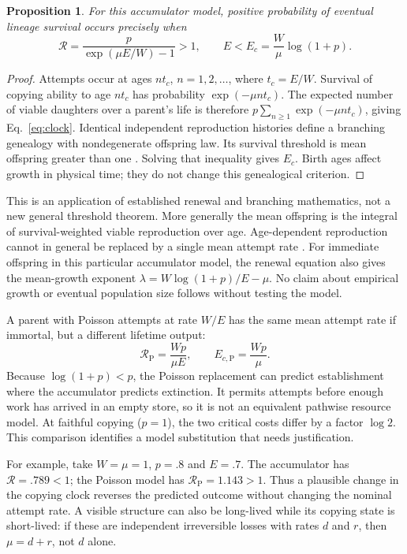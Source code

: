 \documentclass[11pt,a4paper]{article}
\newtheorem{proposition}{Proposition}
\begin{document}
\begin{proposition}
For this accumulator model, positive probability of eventual lineage survival
occurs precisely when
\begin{equation}
 \mathcal R=\frac{p}{\exp(\mu E/W)-1}>1,
 \qquad E<E_c=\frac{W}{\mu}\log(1+p).
 \label{eq:clock}
\end{equation}
\end{proposition}
\begin{proof}
Attempts occur at ages $nt_c$, $n=1,2,\ldots$, where $t_c=E/W$. Survival of copying
ability to age $nt_c$ has probability $\exp(-\mu nt_c)$. The expected number of
viable daughters over a parent's life is therefore
$p\sum_{n\ge1}\exp(-\mu nt_c)$, giving Eq.~\eqref{eq:clock}. Identical independent
reproduction histories define a branching genealogy with nondegenerate offspring
law. Its survival threshold is mean offspring greater than one \cite{branching}.
Solving that inequality gives $E_c$. Birth ages affect growth in physical time;
they do not change this genealogical criterion.
\end{proof}

This is an application of established renewal and branching mathematics, not a
new general threshold theorem. More generally the mean offspring is the integral
of survival-weighted viable reproduction over age. Age-dependent reproduction
cannot in general be replaced by a single mean attempt rate \cite{age}.
For immediate offspring in this particular accumulator model, the renewal equation
also gives the mean-growth exponent $\lambda=W\log(1+p)/E-\mu$. No claim about
empirical growth or eventual population size follows without testing the model.

A parent with Poisson attempts at rate $W/E$ has the same mean attempt rate if
immortal, but a different lifetime output:
\begin{equation}
 \mathcal R_{\mathrm P}=\frac{Wp}{\mu E},\qquad
 E_{c,\mathrm P}=\frac{Wp}{\mu}.
 \label{eq:poisson}
\end{equation}
Because $\log(1+p)<p$, the Poisson replacement can predict establishment where
the accumulator predicts extinction. It permits attempts before enough work
has arrived in an empty store, so it is not an equivalent pathwise resource
model. At faithful copying ($p=1$), the two critical costs differ by a factor
$\log2$. This comparison identifies a model substitution that needs justification.

For example, take $W=\mu=1$, $p=.8$ and $E=.7$. The accumulator has
$\mathcal R=.789<1$; the Poisson model has $\mathcal R_{\mathrm P}=1.143>1$.
Thus a plausible change in the copying clock reverses the predicted outcome
without changing the nominal attempt rate. A visible structure can also be
long-lived while its copying state is short-lived: if these are independent
irreversible losses with rates $d$ and $r$, then $\mu=d+r$, not $d$ alone.
\end{document}

